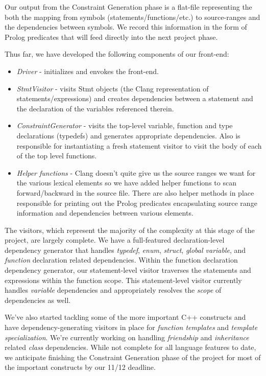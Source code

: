 \documentclass[11pt]{article}
\begin{document}
Our output from the Constraint Generation phase is a flat-file representing the
both the mapping from symbols (statements/functions/etc.) to source-ranges and
the dependencies between symbols. We record this information in the form of
Prolog predicates that will feed directly into the next project phase.


Thus far, we have developed the following components of our front-end:

\begin{itemize}
\item{\emph{Driver} - initializes and envokes the front-end.}

\item{\emph{StmtVisitor} - visits Stmt objects (the Clang representation
  of statements/expressions) and creates dependencies between a statement and
  the declaration of the variables referenced therein.}

\item{\emph{ConstraintGenerator} - visits the top-level variable, function and
  type declarations (typedefs) and generates appropriate dependencies. Also
  is responsible for instantiating a fresh statement visitor to visit the body
  of each of the top level functions.}

\item{\emph{Helper functions} - Clang doesn't quite give us the source ranges we
  want for the various lexical elements so we have added helper functions
  to scan forward/backward in the source file. There are also helper methods in
  place responsible for printing out the Prolog predicates encapsulating source
  range information and dependencies between various elements.}
\end{itemize}

The visitors, which represent the majority of the complexity at this stage of
the project, are largely complete. We have a full-featured declaration-level
dependency generator that handles \emph{typedef}, \emph{enum}, \emph{struct},
\emph{global variable}, and \emph{function} declaration related
dependencies. Within the function declaration dependency generator, our
statement-level visitor traverses the statements and expressions within the
function scope. This statement-level visitor currently handles \emph{variable}
dependencies and appropriately resolves the \emph{scope} of dependencies as
well.

We've also started tackling some of the more important C++ constructs and have
dependency-generating visitors in place for \emph{function templates} and
\emph{template specialization}. We're currently working on handling
\emph{friendship} and \emph{inheritance} related \emph{class}
dependencies. While not complete for all language features to date, we
anticipate finishing the Constraint Generation phase of the project for most of
the important constructs by our 11/12 deadline.
\end{document}
